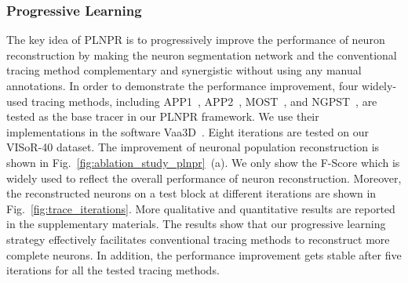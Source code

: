 \subsubsection{Progressive Learning}

The key idea of PLNPR is to progressively improve the performance of neuron reconstruction by making the neuron segmentation network and the conventional tracing method complementary and synergistic without using any manual annotations.
In order to demonstrate the performance improvement, four widely-used tracing methods, including APP1~\cite{Peng2011}, APP2~\cite{Xiao2013}, MOST~\cite{Wu2014}, and NGPST~\cite{Quan2015}, are tested as the base tracer in our PLNPR framework. 
We use their implementations in the software Vaa3D~\cite{Peng2014}. 
%
Eight iterations are tested on our VISoR-40 dataset.
The improvement of neuronal population reconstruction is shown in Fig.~\ref{fig:ablation_study_plnpr}~(a).
We only show the F-Score which is widely used to reflect the overall performance of neuron reconstruction.
%
Moreover, the reconstructed neurons on a test block at different iterations are shown in Fig.~\ref{fig:trace_iterations}.
%
More qualitative and quantitative results are reported in the supplementary materials.
The results show that our progressive learning strategy effectively facilitates conventional tracing methods to reconstruct more complete neurons.
In addition, the performance improvement gets stable after five iterations for all the tested tracing methods. 


